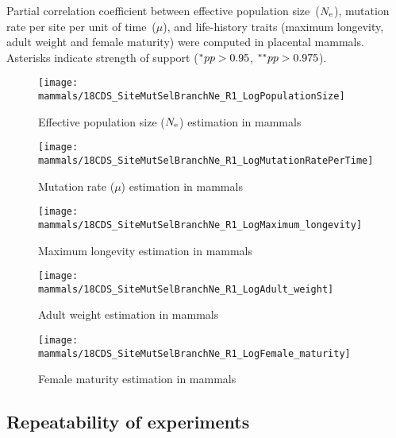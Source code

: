 \begin{table}[H]
    
    \caption[Partial correlation coefficient matrix in mammals]{
        Partial correlation coefficient between effective population size~($\Ne$), mutation rate per site per unit of time~($\mu$), and life-history traits (maximum longevity, adult weight and female maturity) were computed in placental mammals.
        Asterisks indicate strength of support ($\smash{^{*}} pp > 0.95$, $\smash{^{**}} pp > 0.975$).}
    \label{tab:table-partcor-mammals}
\end{table}

\begin{figure}[H]
    \centering
    \texttt{[image: mammals/18CDS\_SiteMutSelBranchNe\_R1\_LogPopulationSize]}
    \caption[$\Ne$ estimation in mammals]{Effective population size ($\Ne$) estimation in mammals}
\end{figure}

\begin{figure}[H]
    \centering
    \texttt{[image: mammals/18CDS\_SiteMutSelBranchNe\_R1\_LogMutationRatePerTime]}
    \caption[Mutation rate estimation in mammals]{Mutation rate ($\mu$) estimation in mammals}
\end{figure}

\begin{figure}[H]
    \centering
    \texttt{[image: mammals/18CDS\_SiteMutSelBranchNe\_R1\_LogMaximum\_longevity]}
    \caption[Maximum longevity estimation in mammals]{Maximum longevity estimation in mammals}
\end{figure}

\begin{figure}[H]
    \centering
    \texttt{[image: mammals/18CDS\_SiteMutSelBranchNe\_R1\_LogAdult\_weight]}
    \caption[Adult weight estimation in mammals]{Adult weight estimation in mammals}
\end{figure}

\begin{figure}[H]
    \centering
    \texttt{[image: mammals/18CDS\_SiteMutSelBranchNe\_R1\_LogFemale\_maturity]}
    \caption[Female maturity estimation in mammals]{Female maturity estimation in mammals}
\end{figure}

\subsection{Repeatability of experiments}
\label{subsec:repeatability-of-experiments-mammals}

